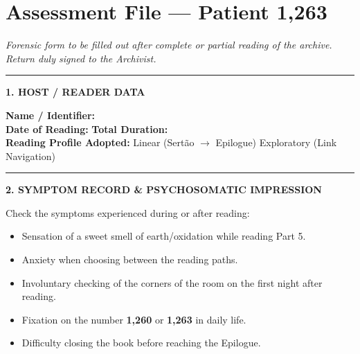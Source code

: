 \cleardoublepage
\thispagestyle{empty}
\chapter*{Assessment File --- Patient 1,263}

\begingroup

\noindent\textit{Forensic form to be filled out after complete or partial reading of the archive. Return duly signed to the Archivist.}

\vspace{0.8em}
\noindent\rule{\textwidth}{0.8pt}
\vspace{0.5em}

\noindent\textbf{1. HOST / READER DATA}

\vspace{0.4em}
\noindent\textbf{Name / Identifier:} \dotfill\\[0.4em]
\noindent\textbf{Date of Reading:} \dotfill \quad \textbf{Total Duration:} \dotfill\\[0.4em]
\noindent\textbf{Reading Profile Adopted:} \quad [ ~ ] Linear (Sertão $\to$ Epilogue) \quad [ ~ ] Exploratory (Link Navigation)

\vspace{1em}
\noindent\rule{\textwidth}{0.5pt}
\vspace{0.5em}

\noindent\textbf{2. SYMPTOM RECORD \& PSYCHOSOMATIC IMPRESSION}

\vspace{0.4em}
\noindent Check the symptoms experienced during or after reading:

\vspace{0.3em}
\begin{itemize}[leftmargin=1.5em,itemsep=0.2em]
  \item[$\square$] Sensation of a sweet smell of earth/oxidation while reading Part 5.
  \item[$\square$] Anxiety when choosing between the reading paths.
  \item[$\square$] Involuntary checking of the corners of the room on the first night after reading.
  \item[$\square$] Fixation on the number \textbf{1,260} or \textbf{1,263} in daily life.
  \item[$\square$] Difficulty closing the book before reaching the Epilogue.
\end{itemize}


